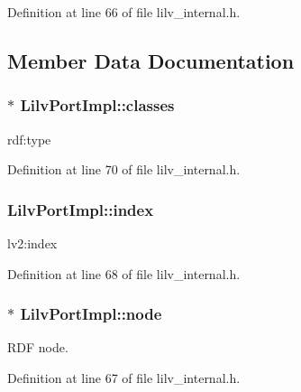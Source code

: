 Definition at line 66 of file lilv\+\_\+internal.\+h.



\subsection{Member Data Documentation}
\subsubsection[{\texorpdfstring{classes}{classes}}]{$\ast$ Lilv\+Port\+Impl\+::classes}\hypertarget{struct_lilv_port_impl_a090b8ea7e0a258563472d7ed8fe6e193}{}\label{struct_lilv_port_impl_a090b8ea7e0a258563472d7ed8fe6e193}


rdf\+:type 



Definition at line 70 of file lilv\+\_\+internal.\+h.

\subsubsection[{\texorpdfstring{index}{index}}]{ Lilv\+Port\+Impl\+::index}\hypertarget{struct_lilv_port_impl_ac9143be2e423888b95e416fbd388ab33}{}\label{struct_lilv_port_impl_ac9143be2e423888b95e416fbd388ab33}


lv2\+:index 



Definition at line 68 of file lilv\+\_\+internal.\+h.

\subsubsection[{\texorpdfstring{node}{node}}]{$\ast$ Lilv\+Port\+Impl\+::node}\hypertarget{struct_lilv_port_impl_a70e1a3f6bc29957faff7a2d1068c1a3b}{}\label{struct_lilv_port_impl_a70e1a3f6bc29957faff7a2d1068c1a3b}


R\+DF node. 



Definition at line 67 of file lilv\+\_\+internal.\+h.

